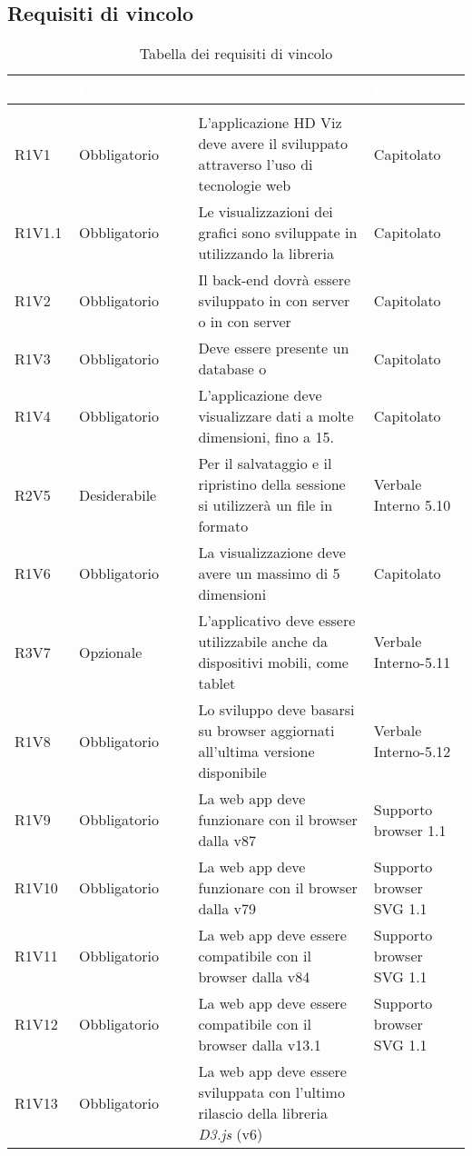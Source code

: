 \subsection{Requisiti di vincolo}
\renewcommand{\arraystretch}{1.5}
\begin{center}
\begin{longtable}{C{2cm} | C{3cm} | C{7cm} | C{3.3cm}}
		\textcolor{white}{\textbf{Codice}} & 
		\textcolor{white}{\textbf{Classificazione}} & 
		\textcolor{white}{\textbf{Descrizione}} & 
		\textcolor{white}{\textbf{Fonti}} \\
		\endfirsthead
	    \\
	    \endfoot
	    \caption{Tabella dei requisiti di vincolo}
	    \endlastfoot

R1V1 & Obbligatorio & L'applicazione HD Viz deve avere il  sviluppato attraverso l'uso di tecnologie web & Capitolato \\
R1V1.1 & Obbligatorio & Le visualizzazioni dei grafici sono sviluppate in  utilizzando la libreria  & Capitolato\\
R1V2 & Obbligatorio & Il back-end dovrà essere sviluppato in  con server  o in  con server  & Capitolato \\
R1V3 & Obbligatorio & Deve essere presente un database  o  & Capitolato\\
R1V4 & Obbligatorio & L'applicazione deve visualizzare dati a molte dimensioni, fino a 15. & Capitolato\\
R2V5 & Desiderabile & Per il salvataggio e il ripristino della sessione si utilizzerà un file in formato  & Verbale Interno 5.10\\
R1V6 & Obbligatorio & La visualizzazione  deve avere un massimo di 5 dimensioni & Capitolato\\
R3V7 & Opzionale & L'applicativo deve essere utilizzabile anche da dispositivi mobili, come tablet & Verbale Interno-5.11\\
R1V8 & Obbligatorio & Lo sviluppo deve basarsi su browser aggiornati all'ultima versione disponibile & Verbale Interno-5.12\\
R1V9 & Obbligatorio & La web app deve funzionare con il browser  dalla v87 & Supporto browser  1.1 \\
R1V10 & Obbligatorio & La web app deve funzionare con il browser  dalla v79 & Supporto browser SVG 1.1 \\
R1V11 & Obbligatorio & La web app deve essere compatibile con il browser  dalla v84 & Supporto browser SVG 1.1\\
R1V12 & Obbligatorio & La web app deve essere compatibile con il browser  dalla v13.1 & Supporto browser SVG 1.1\\
R1V13 & Obbligatorio & La web app deve essere sviluppata con l'ultimo rilascio della libreria \textit{D3.js} (v6) & \\




\end{longtable}
\end{center}
